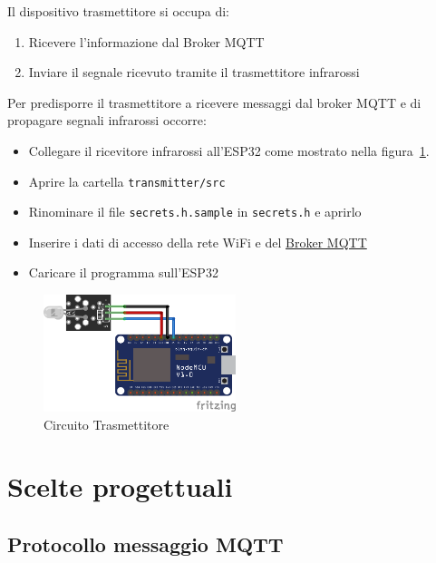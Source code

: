 \documentclass[a4paper,11pt]{article}
\begin{document}
    Il dispositivo trasmettitore si occupa di:

    \begin{enumerate}
        \item Ricevere l'informazione dal Broker MQTT
        \item Inviare il segnale ricevuto tramite il trasmettitore infrarossi
    \end{enumerate}

    Per predisporre il trasmettitore a ricevere messaggi dal broker MQTT e di propagare segnali infrarossi occorre:

    \begin{itemize}
        \item Collegare il ricevitore infrarossi all'ESP32 come mostrato nella figura~\ref{fig:circuito_trasmettitore}.
            
        \item Aprire la cartella \texttt{transmitter/src}
        \item Rinominare il file \texttt{secrets.h.sample} in \texttt{secrets.h} e aprirlo
        \item Inserire i dati di accesso della rete WiFi e del \hyperref[subsec:Broker]{Broker MQTT}
        \item Caricare il programma sull'ESP32
    \end{itemize}

    \begin{figure}[H]
        \centering
        \includegraphics[width=0.5\textwidth,height=\textheight,keepaspectratio]{assets/transmitter_fritzing}
        \caption{Circuito Trasmettitore}
        \label{fig:circuito_trasmettitore}
    \end{figure}

\section{Scelte progettuali}

    \subsection{Protocollo messaggio MQTT}
\end{document}
